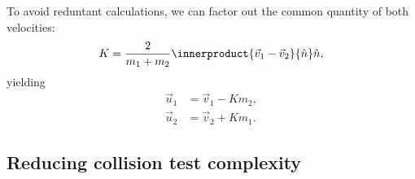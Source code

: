 To avoid reduntant calculations, we can factor out the common quantity of both velocities:
\begin{equation}
	K = \frac{2}{m_{1}+m_{2}}\innerproduct{\vec{v}_{1}-\vec{v}_{2}}{\hat{n}}\hat{n},
	\label{eq:elastic_collision_common_quantity}
\end{equation}
yielding
\begin{equation}
	\begin{aligned}
		\vec{u}_{1} & = \vec{v}_{1}-Km_{2}, \\
		\vec{u}_{2} & = \vec{v}_{2}+Km_{1}.
	\end{aligned}
	\label{eq:elastic_collision_final_equation}
\end{equation}

\subsection{Reducing collision test complexity}
